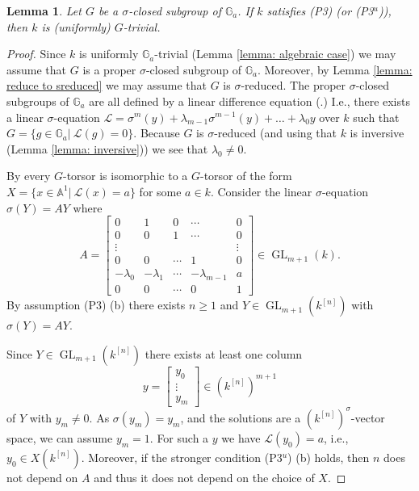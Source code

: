 \documentclass[oneside,reqno]{amsart}
\newtheorem{lemma}[theo]{Lemma}
\theoremstyle{definition}
\newcommand{\Gl}{\operatorname{GL}}
\newcommand{\A}{\mathbb{A}}
\newcommand{\s}{\sigma}
\newcommand{\Gm}{\mathbb{G}_m}
\newcommand{\Ga}{\mathbb{G}_a}
\newcommand{\kn}{k^{[n]}}
\newcommand{\pt}{{\rm{(P3$^u$)}}}
\newcommand{\ptweak}{{\rm{(P3)}}}
\begin{document}
	\begin{lemma} \label{lemma: subgroups of Ga}
 Let $G$ be a $\s$-closed subgroup of $\Ga$. 
		If $k$ satisfies \ptweak{} (or \pt{}), then $k$ is (uniformly) $G$-trivial.
	\end{lemma}
	\begin{proof}
		Since $k$ is uniformly $\Ga$-trivial (Lemma \ref{lemma: algebraic case}) we may assume that $G$ is a proper $\s$-closed subgroup of $\Ga$. Moreover, by Lemma \ref{lemma: reduce to sreduced} we may assume that $G$ is $\s$-reduced. The proper $\s$-closed subgroups of $\Ga$ are all defined by a linear difference equation (\cite[Cor. A.3]{DiVizioHardouinWibmer:DifferenceAlgebraicRelations}.) I.e.,  there exists a linear $\s$-equation $\mathcal{L}=\s^m(y)+\lambda_{m-1}\s^{m-1}(y)+\ldots+\lambda_0 y$ over $k$ such that $G=\{g\in \Ga|\ \mathcal{L}(g)=0\}$. Because $G$ is $\s$-reduced (and using that $k$ is inversive (Lemma \ref{lemma: inversive})) we see that $\lambda_0\neq 0$.
		
		
		By \cite[Example 5.4 ]{BachmayrWibmer:TorsorsForDifferenceAlgebraicGroups} every $G$-torsor is isomorphic to a $G$-torsor of the form $X=\{x\in \A^1|\ \mathcal{L}(x)=a\}$ for some $a\in k$. Consider the linear $\s$-equation $\s(Y)=AY$ where 
		$$A=\left[\begin{array}{ccccc}
		0 & 1 & 0 & \cdots & 0 \\
		0 & 0 & 1 & \cdots & 0 \\
		\vdots & &  &   & \vdots \\
		0 & 0 & \cdots & 1 & 0 \\	 
		-\lambda_0 & -\lambda_1 & \cdots & -\lambda_{m-1} & a \\
		0 & 0 & \cdots & 0 & 1 	
		\end{array}\right]\in\Gl_{m+1}(k).
		$$ 	
		By assumption \ptweak{} (b) there exists $n\geq 1$ and $Y\in\Gl_{m+1}(\kn)$ with $\s(Y)=AY$.
		  
		Since $Y\in\Gl_{m+1}(\kn)$ there exists at least one column
		$$y=\left[\begin{array}{c}
		y_0 \\
		\vdots \\
		y_m
		\end{array}
		\right]\in (\kn)^{m+1}
		$$
		of $Y$
		with $y_m\neq 0$. As $\s(y_m)=y_m$, and the solutions are a $(\kn)^\s$-vector space, we can assume $y_m=1$. For such a $y$ we have $\mathcal{L}(y_0)=a$, i.e., $y_0\in X(\kn)$. Moreover, if the stronger condition \pt{} (b) holds, then $n$ does not depend on $A$ and thus it does not depend on the choice of $X$. 		
\end{proof}
	
\end{document}
